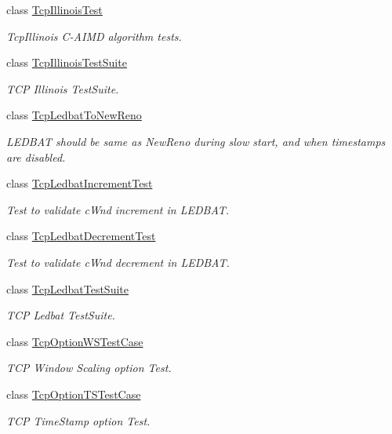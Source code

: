\begin{DoxyCompactItemize}
class \hyperlink{classTcpIllinoisTest}{Tcp\+Illinois\+Test}
\begin{DoxyCompactList}\small\item\em Tcp\+Illinois C-\/\+A\+I\+MD algorithm tests. \end{DoxyCompactList}\item 
class \hyperlink{classTcpIllinoisTestSuite}{Tcp\+Illinois\+Test\+Suite}
\begin{DoxyCompactList}\small\item\em T\+CP Illinois Test\+Suite. \end{DoxyCompactList}\item 
class \hyperlink{classTcpLedbatToNewReno}{Tcp\+Ledbat\+To\+New\+Reno}
\begin{DoxyCompactList}\small\item\em L\+E\+D\+B\+AT should be same as New\+Reno during slow start, and when timestamps are disabled. \end{DoxyCompactList}\item 
class \hyperlink{classTcpLedbatIncrementTest}{Tcp\+Ledbat\+Increment\+Test}
\begin{DoxyCompactList}\small\item\em Test to validate c\+Wnd increment in L\+E\+D\+B\+AT. \end{DoxyCompactList}\item 
class \hyperlink{classTcpLedbatDecrementTest}{Tcp\+Ledbat\+Decrement\+Test}
\begin{DoxyCompactList}\small\item\em Test to validate c\+Wnd decrement in L\+E\+D\+B\+AT. \end{DoxyCompactList}\item 
class \hyperlink{classTcpLedbatTestSuite}{Tcp\+Ledbat\+Test\+Suite}
\begin{DoxyCompactList}\small\item\em T\+CP Ledbat Test\+Suite. \end{DoxyCompactList}\item 
class \hyperlink{classTcpOptionWSTestCase}{Tcp\+Option\+W\+S\+Test\+Case}
\begin{DoxyCompactList}\small\item\em T\+CP Window Scaling option Test. \end{DoxyCompactList}\item 
class \hyperlink{classTcpOptionTSTestCase}{Tcp\+Option\+T\+S\+Test\+Case}
\begin{DoxyCompactList}\small\item\em T\+CP Time\+Stamp option Test. \end{DoxyCompactList}\item 

\end{DoxyCompactItemize}
